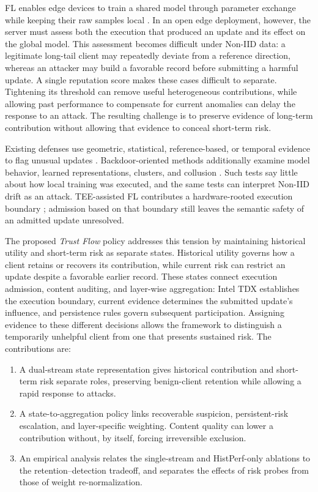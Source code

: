 \documentclass[runningheads,orivec]{llncs}
\newenvironment{tightenumerate}{%
    \begin{enumerate}\setlength{\itemsep}{1pt}\setlength{\parskip}{0pt}\setlength{\parsep}{0pt}}{\end{enumerate}}
\begin{document}
FL enables edge devices to train a shared model through parameter exchange while keeping their raw samples local \cite{kairouz2021flsurvey,mcmahan2017fedavg}. In an open edge deployment, however, the server must assess both the execution that produced an update and its effect on the global model. This assessment becomes difficult under Non-IID data: a legitimate long-tail client may repeatedly deviate from a reference direction, whereas an attacker may build a favorable record before submitting a harmful update. A single reputation score makes these cases difficult to separate. Tightening its threshold can remove useful heterogeneous contributions, while allowing past performance to compensate for current anomalies can delay the response to an attack. The resulting challenge is to preserve evidence of long-term contribution without allowing that evidence to conceal short-term risk.

Existing defenses use geometric, statistical, reference-based, or temporal evidence to flag unusual updates \cite{blanchard2017krum,yin2018byzantine,cao2021fltrust,fung2020foolsgold,fldetector2022}. Backdoor-oriented methods additionally examine model behavior, learned representations, clusters, and collusion \cite{deepsight2022,flame2022,crowdguard2024,roseagg}. Such tests say little about how local training was executed, and the same tests can interpret Non-IID drift as an attack. TEE-assisted FL contributes a hardware-rooted execution boundary \cite{r1_tee_integrity,xu2021distributed,r5_tee_mitigating,lu2025tmt}; admission based on that boundary still leaves the semantic safety of an admitted update unresolved.

The proposed \emph{Trust Flow} policy addresses this tension by maintaining historical utility and short-term risk as separate states. Historical utility governs how a client retains or recovers its contribution, while current risk can restrict an update despite a favorable earlier record. These states connect execution admission, content auditing, and layer-wise aggregation: Intel TDX establishes the execution boundary, current evidence determines the submitted update's influence, and persistence rules govern subsequent participation. Assigning evidence to these different decisions allows the framework to distinguish a temporarily unhelpful client from one that presents sustained risk. The contributions are:
\begin{tightenumerate}
\item A dual-stream state representation gives historical contribution and short-term risk separate roles, preserving benign-client retention while allowing a rapid response to attacks.
\item A state-to-aggregation policy links recoverable suspicion, persistent-risk escalation, and layer-specific weighting. Content quality can lower a contribution without, by itself, forcing irreversible exclusion.
\item An empirical analysis relates the single-stream and HistPerf-only ablations to the retention--detection tradeoff, and separates the effects of risk probes from those of weight re-normalization.
\end{tightenumerate}
\end{document}
